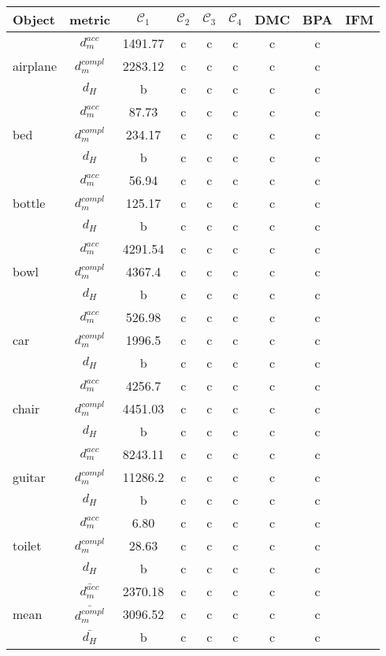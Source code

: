 \begin{center}
     \label{tab:distance7500} 
    \begin{tabular}{| l | c | c | c | c | c | c | c | c |}
        \hline
        Object& metric& $\mathcal{C}_1$ & $\mathcal{C}_2$ & $\mathcal{C}_3$ & $\mathcal{C}_4$ & DMC & BPA & IFM \\ \hline
        \multirow{3}{*}{airplane}&$d_m^{acc}$&1491.77&c&c&c&c&c&\\
        &$d_m^{compl}$&2283.12&c&c&c&c&c&\\
        &$d_H$&b&c&c&c&c&c&\\
        \hline
        \multirow{3}{*}{bed}&$d_m^{acc}$&87.73&c&c&c&c&c&\\
        &$d_m^{compl}$&234.17&c&c&c&c&c&\\
        &$d_H$&b&c&c&c&c&c&\\
        \hline
        \multirow{3}{*}{bottle}&$d_m^{acc}$&56.94&c&c&c&c&c&\\
        &$d_m^{compl}$&125.17&c&c&c&c&c&\\
        &$d_H$&b&c&c&c&c&c&\\
        \hline
        \multirow{3}{*}{bowl}&$d_m^{acc}$&4291.54&c&c&c&c&c&\\
        &$d_m^{compl}$&4367.4&c&c&c&c&c&\\
        &$d_H$&b&c&c&c&c&c&\\
        \hline
        \multirow{3}{*}{car}&$d_m^{acc}$&526.98&c&c&c&c&c&\\
        &$d_m^{compl}$&1996.5&c&c&c&c&c&\\
        &$d_H$&b&c&c&c&c&c&\\
        \hline
        \multirow{3}{*}{chair}&$d_m^{acc}$&4256.7&c&c&c&c&c&\\
        &$d_m^{compl}$&4451.03&c&c&c&c&c&\\
        &$d_H$&b&c&c&c&c&c&\\
        \hline
        \multirow{3}{*}{guitar}&$d_m^{acc}$&8243.11&c&c&c&c&c&\\
        &$d_m^{compl}$&11286.2&c&c&c&c&c&\\
        &$d_H$&b&c&c&c&c&c&\\
        \hline
        \multirow{3}{*}{toilet}&$d_m^{acc}$&6.80&c&c&c&c&c&\\
        &$d_m^{compl}$&28.63&c&c&c&c&c&\\
        &$d_H$&b&c&c&c&c&c&\\
        \hline\hline
        \multirow{3}{*}{mean}&$\bar{d_m^{acc}}$&2370.18&c&c&c&c&c&\\
        &$\bar{d_m^{compl}}$&3096.52&c&c&c&c&c&\\
        &$\bar{d_H}$&b&c&c&c&c&c&\\
        \hline
    \end{tabular}
\end{center}


